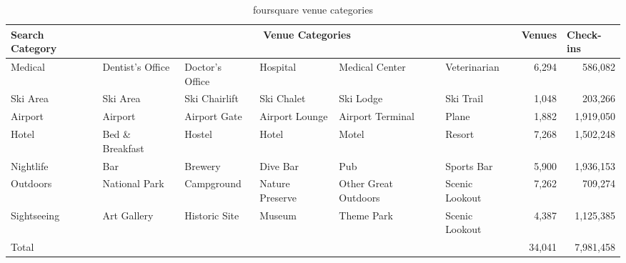 \begin{sidewaystable}[]
\centering
\caption{foursquare venue categories}
\label{table:foursquare_categories}

\centering %

\begin{tabular}{lrrrrrrr}
\toprule
Search Category & \multicolumn{5}{c}{Venue Categories}  & \multicolumn{1}{l}{Venues} & \multicolumn{1}{l}{Check-ins} \\
\midrule
Medical & \multicolumn{1}{l}{Dentist's Office} & \multicolumn{1}{l}{Doctor's Office} & \multicolumn{1}{l}{Hospital} & \multicolumn{1}{l}{Medical Center} & \multicolumn{1}{l}{Veterinarian} &          6,294  &              586,082  \\
Ski Area & \multicolumn{1}{l}{Ski Area} & \multicolumn{1}{l}{Ski Chairlift} & \multicolumn{1}{l}{Ski Chalet} & \multicolumn{1}{l}{Ski Lodge} & \multicolumn{1}{l}{Ski Trail} &          1,048  &              203,266  \\
Airport & \multicolumn{1}{l}{Airport} & \multicolumn{1}{l}{Airport Gate} & \multicolumn{1}{l}{Airport Lounge} & \multicolumn{1}{l}{Airport Terminal} & \multicolumn{1}{l}{Plane} &          1,882  &          1,919,050  \\
Hotel & \multicolumn{1}{l}{Bed \& Breakfast} & \multicolumn{1}{l}{Hostel} & \multicolumn{1}{l}{Hotel} & \multicolumn{1}{l}{Motel} & \multicolumn{1}{l}{Resort} &          7,268  &          1,502,248  \\
Nightlife & \multicolumn{1}{l}{Bar} & \multicolumn{1}{l}{Brewery} & \multicolumn{1}{l}{Dive Bar} & \multicolumn{1}{l}{Pub} & \multicolumn{1}{l}{Sports Bar} &          5,900  &          1,936,153  \\
Outdoors & \multicolumn{1}{l}{National Park} & \multicolumn{1}{l}{Campground} & \multicolumn{1}{l}{Nature Preserve} & \multicolumn{1}{l}{Other Great Outdoors} & \multicolumn{1}{l}{Scenic Lookout} &          7,262  &              709,274  \\
Sightseeing & \multicolumn{1}{l}{Art Gallery} & \multicolumn{1}{l}{Historic Site} & \multicolumn{1}{l}{Museum} & \multicolumn{1}{l}{Theme Park} & \multicolumn{1}{l}{Scenic Lookout} &          4,387  &          1,125,385  \\
\midrule
Total &       &       &       &       &       &       34,041  &          7,981,458  \\
\end{tabular}%

\end{sidewaystable}


